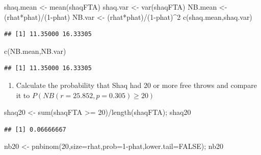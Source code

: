 \documentclass[
  11pt,
]{book}
\newenvironment{Shaded}{\begin{snugshade}}{\end{snugshade}}
\newcommand{\AttributeTok}[1]{\textcolor[rgb]{0.77,0.63,0.00}{#1}}
\newcommand{\ConstantTok}[1]{\textcolor[rgb]{0.00,0.00,0.00}{#1}}
\newcommand{\DecValTok}[1]{\textcolor[rgb]{0.00,0.00,0.81}{#1}}
\newcommand{\FunctionTok}[1]{\textcolor[rgb]{0.00,0.00,0.00}{#1}}
\newcommand{\NormalTok}[1]{#1}
\newcommand{\OtherTok}[1]{\textcolor[rgb]{0.56,0.35,0.01}{#1}}
\newcommand{\SpecialCharTok}[1]{\textcolor[rgb]{0.00,0.00,0.00}{#1}}
\providecommand{\tightlist}{%
  \setlength{\itemsep}{0pt}\setlength{\parskip}{0pt}}
\theoremstyle{definition}
\theoremstyle{definition}
\theoremstyle{definition}
\theoremstyle{definition}
\theoremstyle{remark}
\begin{document}
\begin{Shaded}
\begin{Highlighting}[]
\NormalTok{shaq.mean }\OtherTok{\textless{}{-}} \FunctionTok{mean}\NormalTok{(shaqFTA)}
\NormalTok{shaq.var }\OtherTok{\textless{}{-}} \FunctionTok{var}\NormalTok{(shaqFTA)}
\NormalTok{NB.mean }\OtherTok{\textless{}{-}}\NormalTok{ (rhat}\SpecialCharTok{*}\NormalTok{phat)}\SpecialCharTok{/}\NormalTok{(}\DecValTok{1}\SpecialCharTok{{-}}\NormalTok{phat)}
\NormalTok{NB.var }\OtherTok{\textless{}{-}}\NormalTok{ (rhat}\SpecialCharTok{*}\NormalTok{phat)}\SpecialCharTok{/}\NormalTok{(}\DecValTok{1}\SpecialCharTok{{-}}\NormalTok{phat)}\SpecialCharTok{\^{}}\DecValTok{2}
\FunctionTok{c}\NormalTok{(shaq.mean,shaq.var)}
\end{Highlighting}
\end{Shaded}

\begin{verbatim}
## [1] 11.35000 16.33305
\end{verbatim}

\begin{Shaded}
\begin{Highlighting}[]
\FunctionTok{c}\NormalTok{(NB.mean,NB.var)}
\end{Highlighting}
\end{Shaded}

\begin{verbatim}
## [1] 11.35000 16.33305
\end{verbatim}

\begin{enumerate}
\def\labelenumi{(\alph{enumi})}
\setcounter{enumi}{3}
\tightlist
\item
  Calculate the probability that Shaq had 20 or more free throws and compare it to \(P(NB(r=25.852,p=0.305) \geq 20)\)
\end{enumerate}

\begin{Shaded}
\begin{Highlighting}[]
\NormalTok{shaq20 }\OtherTok{\textless{}{-}} \FunctionTok{sum}\NormalTok{(shaqFTA }\SpecialCharTok{\textgreater{}=} \DecValTok{20}\NormalTok{)}\SpecialCharTok{/}\FunctionTok{length}\NormalTok{(shaqFTA); shaq20}
\end{Highlighting}
\end{Shaded}

\begin{verbatim}
## [1] 0.06666667
\end{verbatim}

\begin{Shaded}
\begin{Highlighting}[]
\NormalTok{nb20 }\OtherTok{\textless{}{-}} \FunctionTok{pnbinom}\NormalTok{(}\DecValTok{20}\NormalTok{,}\AttributeTok{size=}\NormalTok{rhat,}\AttributeTok{prob=}\DecValTok{1}\SpecialCharTok{{-}}\NormalTok{phat,}\AttributeTok{lower.tail=}\ConstantTok{FALSE}\NormalTok{); nb20}
\end{Highlighting}
\end{Shaded}
\end{document}
